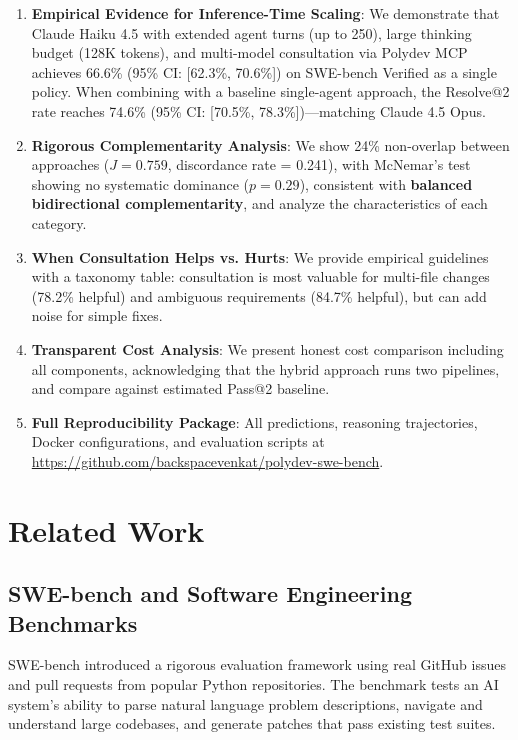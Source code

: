 \documentclass[11pt,a4paper]{article}
\begin{document}
\begin{enumerate}
    \item \textbf{Empirical Evidence for Inference-Time Scaling}: We demonstrate that Claude Haiku 4.5 with extended agent turns (up to 250), large thinking budget (128K tokens), and multi-model consultation via Polydev MCP achieves 66.6\% (95\% CI: [62.3\%, 70.6\%]) on SWE-bench Verified as a single policy. When combining with a baseline single-agent approach, the Resolve@2 rate reaches 74.6\% (95\% CI: [70.5\%, 78.3\%])---matching Claude 4.5 Opus.

    \item \textbf{Rigorous Complementarity Analysis}: We show 24\% non-overlap between approaches ($J = 0.759$, discordance rate = 0.241), with McNemar's test showing no systematic dominance ($p = 0.29$), consistent with \textbf{balanced bidirectional complementarity}, and analyze the characteristics of each category.

    \item \textbf{When Consultation Helps vs. Hurts}: We provide empirical guidelines with a taxonomy table: consultation is most valuable for multi-file changes (78.2\% helpful) and ambiguous requirements (84.7\% helpful), but can add noise for simple fixes.

    \item \textbf{Transparent Cost Analysis}: We present honest cost comparison including all components, acknowledging that the hybrid approach runs two pipelines, and compare against estimated Pass@2 baseline.

    \item \textbf{Full Reproducibility Package}: All predictions, reasoning trajectories, Docker configurations, and evaluation scripts at \url{https://github.com/backspacevenkat/polydev-swe-bench}.
\end{enumerate}

\section{Related Work}

\subsection{SWE-bench and Software Engineering Benchmarks}

SWE-bench \citep{jimenez2024swebench} introduced a rigorous evaluation framework using real GitHub issues and pull requests from popular Python repositories. The benchmark tests an AI system's ability to parse natural language problem descriptions, navigate and understand large codebases, and generate patches that pass existing test suites.
\end{document}
